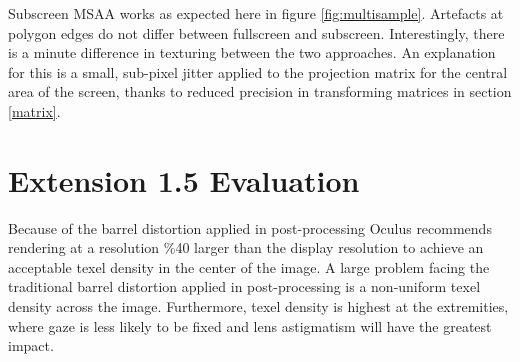 \documentclass[12pt,a4paper,twoside,openright]{report}
\begin{document}
Subscreen MSAA works as expected here in figure \ref{fig:multisample}. Artefacts at polygon edges do not differ between fullscreen and subscreen. Interestingly, there is a minute difference in texturing between the two approaches. An explanation for this is a small, sub-pixel jitter applied to the projection matrix for the central area of the screen, thanks to reduced precision in transforming matrices in section \ref{matrix}.

\clearpage

\section{Extension 1.5 Evaluation}

Because of the barrel distortion applied in post-processing Oculus recommends rendering at a resolution \%40 larger than the display resolution to achieve an acceptable texel density in the center of the image.
A large problem facing the traditional barrel distortion applied in post-processing is a non-uniform texel density across the image. Furthermore, texel density is highest at the extremities, where gaze is less likely to be fixed and lens astigmatism will have the greatest impact. 
\end{document}
